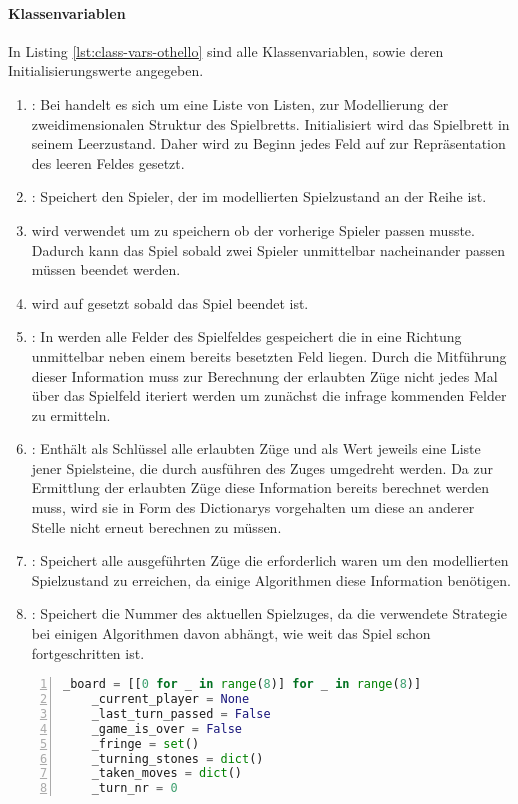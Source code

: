\paragraph{Klassenvariablen}
In Listing \ref{lst:class-vars-othello} sind alle Klassenvariablen, sowie deren Initialisierungswerte angegeben.
\begin{enumerate}
\item {}: Bei  handelt es sich um eine Liste von Listen, zur Modellierung der zweidimensionalen Struktur des Spielbretts. Initialisiert wird das Spielbrett in seinem Leerzustand. Daher wird zu Beginn jedes Feld auf  zur Repräsentation des leeren Feldes gesetzt.
\item {}: Speichert den Spieler, der im modellierten Spielzustand an der Reihe ist.
\item {} wird verwendet um zu speichern ob der vorherige Spieler  passen musste. Dadurch kann das Spiel sobald zwei Spieler unmittelbar nacheinander passen müssen beendet werden.
\item {} wird auf  gesetzt sobald das Spiel beendet ist.
\item {}: In  werden alle Felder des Spielfeldes gespeichert die in eine Richtung unmittelbar neben einem bereits besetzten Feld liegen. Durch die Mitführung dieser Information muss zur Berechnung der erlaubten Züge nicht jedes Mal über das Spielfeld iteriert werden um zunächst die infrage kommenden Felder zu ermitteln.
\item {}: Enthält als Schlüssel alle erlaubten Züge und als Wert jeweils eine Liste jener Spielsteine, die durch ausführen des Zuges umgedreht werden. Da zur Ermittlung der erlaubten Züge diese Information bereits berechnet werden muss, wird sie in Form des Dictionarys vorgehalten um diese an anderer Stelle nicht erneut berechnen zu müssen.
\item {}: Speichert alle ausgeführten Züge die erforderlich waren um den modellierten Spielzustand zu erreichen, da einige Algorithmen diese Information benötigen.
\item {}: Speichert die Nummer des aktuellen Spielzuges, da die verwendete Strategie bei einigen Algorithmen davon abhängt, wie weit das Spiel schon fortgeschritten ist.
\end{enumerate}
\begin{lstlisting}[basicstyle=\footnotesize, caption = {Klassenvariablen der Klasse \mxZitat{Othello}}, language = python, captionpos = t , numbers=left, label={lst:class-vars-othello}]
    _board = [[0 for _ in range(8)] for _ in range(8)]
    _current_player = None 
    _last_turn_passed = False
    _game_is_over = False
    _fringe = set()
    _turning_stones = dict()    
    _taken_moves = dict()
    _turn_nr = 0
\end{lstlisting}
